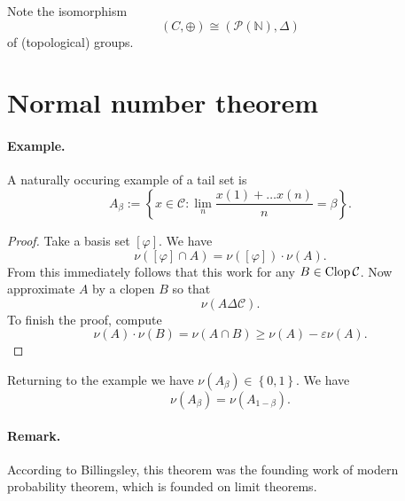 Note the isomorphism
\[ 
    (C, \oplus) \cong ( \mathcal{P}( \mathbb{N} ), \Delta ) 
\]
of (topological) groups.

\section{Normal number theorem}


\paragraph{Example.} A naturally occuring example of a tail set is
\[ 
    A_\beta := \left\{ x \in \mathcal{C} : \lim_n \frac{x(1) + \ldots x(n)}{n}= \beta \right\}.
\]


\begin{proof}
Take a basis set \( \left[ \varphi \right] \). We have
\[ 
    \nu \left( \left[ \varphi \right] \cap A \right) = \nu \left( \left[ \varphi \right] \right) \cdot \nu(A).
\]
From this immediately follows that this work for any \( B \in \operatorname{Clop} \mathcal{C} \).
Now approximate \( A \) by a clopen \( B \) so that
\[ 
    \nu \left( A \Delta \mathcal{C} \right).
\]
To finish the proof, compute
\[ 
    \nu(A) \cdot \nu(B) = \nu( A \cap B ) \geqslant \nu(A) -\varepsilon\nu(A). 
\]
\end{proof}

Returning to the example we have \( \nu(A_\beta) \in \left\{ 0,1 \right\} \). We have
\[ 
    \nu(A_\beta) = \nu (A_{1-\beta}).
\]


\paragraph{Remark.} According to Billingsley, this theorem was the founding work of modern probability theorem, which is founded on limit theorems.
